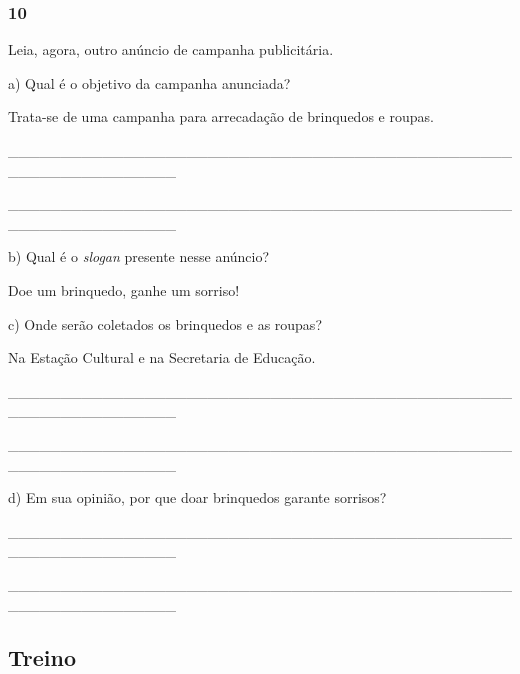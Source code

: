 \subsubsection{10}\label{section-43}

Leia, agora, outro anúncio de campanha publicitária.


a) Qual é o objetivo da campanha anunciada?

Trata-se de uma campanha para arrecadação de brinquedos e roupas.

\protect\hypertarget{_Hlk127709586}{}{}\_\_\_\_\_\_\_\_\_\_\_\_\_\_\_\_\_\_\_\_\_\_\_\_\_\_\_\_\_\_\_\_\_\_\_\_\_\_\_\_\_\_\_\_\_\_\_\_\_\_\_\_\_\_\_\_\_\_\_\_\_\_\_\_

\_\_\_\_\_\_\_\_\_\_\_\_\_\_\_\_\_\_\_\_\_\_\_\_\_\_\_\_\_\_\_\_\_\_\_\_\_\_\_\_\_\_\_\_\_\_\_\_\_\_\_\_\_\_\_\_\_\_\_\_\_\_\_\_

b) Qual é o \textit{slogan} presente nesse anúncio?

Doe um brinquedo, ganhe um sorriso!

c) Onde serão coletados os brinquedos e as roupas?

Na Estação Cultural e na Secretaria de Educação.

\_\_\_\_\_\_\_\_\_\_\_\_\_\_\_\_\_\_\_\_\_\_\_\_\_\_\_\_\_\_\_\_\_\_\_\_\_\_\_\_\_\_\_\_\_\_\_\_\_\_\_\_\_\_\_\_\_\_\_\_\_\_\_\_

\_\_\_\_\_\_\_\_\_\_\_\_\_\_\_\_\_\_\_\_\_\_\_\_\_\_\_\_\_\_\_\_\_\_\_\_\_\_\_\_\_\_\_\_\_\_\_\_\_\_\_\_\_\_\_\_\_\_\_\_\_\_\_\_

d) Em sua opinião, por que doar brinquedos garante sorrisos?


\_\_\_\_\_\_\_\_\_\_\_\_\_\_\_\_\_\_\_\_\_\_\_\_\_\_\_\_\_\_\_\_\_\_\_\_\_\_\_\_\_\_\_\_\_\_\_\_\_\_\_\_\_\_\_\_\_\_\_\_\_\_\_\_

\_\_\_\_\_\_\_\_\_\_\_\_\_\_\_\_\_\_\_\_\_\_\_\_\_\_\_\_\_\_\_\_\_\_\_\_\_\_\_\_\_\_\_\_\_\_\_\_\_\_\_\_\_\_\_\_\_\_\_\_\_\_\_\_

\subsection{Treino}\label{treino-3}

